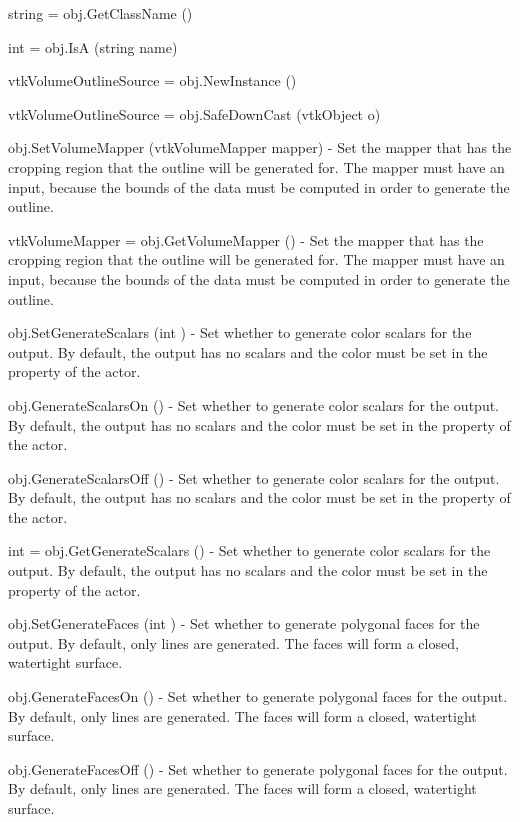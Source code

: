 \begin{DoxyItemize}
\item {\ttfamily string = obj.\-Get\-Class\-Name ()}  
\item {\ttfamily int = obj.\-Is\-A (string name)}  
\item {\ttfamily vtk\-Volume\-Outline\-Source = obj.\-New\-Instance ()}  
\item {\ttfamily vtk\-Volume\-Outline\-Source = obj.\-Safe\-Down\-Cast (vtk\-Object o)}  
\item {\ttfamily obj.\-Set\-Volume\-Mapper (vtk\-Volume\-Mapper mapper)} -\/ Set the mapper that has the cropping region that the outline will be generated for. The mapper must have an input, because the bounds of the data must be computed in order to generate the outline.  
\item {\ttfamily vtk\-Volume\-Mapper = obj.\-Get\-Volume\-Mapper ()} -\/ Set the mapper that has the cropping region that the outline will be generated for. The mapper must have an input, because the bounds of the data must be computed in order to generate the outline.  
\item {\ttfamily obj.\-Set\-Generate\-Scalars (int )} -\/ Set whether to generate color scalars for the output. By default, the output has no scalars and the color must be set in the property of the actor.  
\item {\ttfamily obj.\-Generate\-Scalars\-On ()} -\/ Set whether to generate color scalars for the output. By default, the output has no scalars and the color must be set in the property of the actor.  
\item {\ttfamily obj.\-Generate\-Scalars\-Off ()} -\/ Set whether to generate color scalars for the output. By default, the output has no scalars and the color must be set in the property of the actor.  
\item {\ttfamily int = obj.\-Get\-Generate\-Scalars ()} -\/ Set whether to generate color scalars for the output. By default, the output has no scalars and the color must be set in the property of the actor.  
\item {\ttfamily obj.\-Set\-Generate\-Faces (int )} -\/ Set whether to generate polygonal faces for the output. By default, only lines are generated. The faces will form a closed, watertight surface.  
\item {\ttfamily obj.\-Generate\-Faces\-On ()} -\/ Set whether to generate polygonal faces for the output. By default, only lines are generated. The faces will form a closed, watertight surface.  
\item {\ttfamily obj.\-Generate\-Faces\-Off ()} -\/ Set whether to generate polygonal faces for the output. By default, only lines are generated. The faces will form a closed, watertight surface.  

\end{DoxyItemize}
